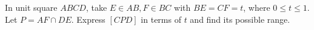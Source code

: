 In unit square $ ABCD $, take $ E\in AB,F\in BC $ with $ BE=CF=t $, where $ 0\le t\le1 $. Let $ P=AF\cap DE $. Express $[CPD]$ in terms of $ t $ and find its possible range.
